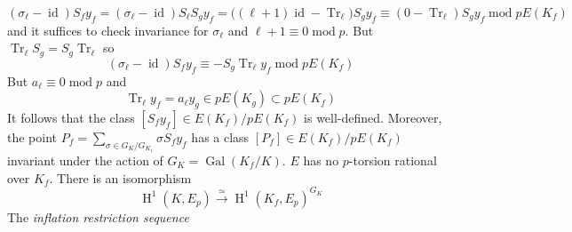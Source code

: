 \documentclass[paper=a4, fontsize=11pt]{scrartcl}
\DeclareMathOperator{\id}{\text{id}}
\DeclareMathOperator{\Gal}{\text{Gal}}
\DeclareMathOperator{\Tr}{\text{Tr}}
\DeclareMathOperator{\mmm}{\text{ mod }}
\DeclareMathOperator{\hoho}{\text{H}}
\numberwithin{equation}{section}
\numberwithin{figure}{section}
\numberwithin{table}{section}
\begin{document}
$$(\sigma_\ell-\id)S_fy_f=(\sigma_\ell-\id)S_\ell S_g y_f=\Big((\ell+1)\id-\Tr_\ell\Big)S_g y_f\equiv (0 - \Tr_\ell)S_gy_f\mmm pE(K_f)$$
and it suffices to check invariance for $\sigma_\ell$ and $\ell+1\equiv 0\mmm p $. But $\Tr_\ell S_g=S_g\Tr_\ell$ so
$$(\sigma_\ell-\id)S_fy_f\equiv - S_g\Tr_\ell y_f\mmm pE(K_f)$$
But $a_\ell\equiv 0 \mmm p$ and
$$\Tr_\ell y_f=a_\ell y_g\in pE(K_g)\subset pE(K_f)$$ 
It follows that the class $[S_f y_f]\in E(K_f)/pE(K_f)$ is well-defined. Moreover, the point $P_f=\sum_{\sigma\in G_K/G_{K_1}}\sigma S_f y_f$ has a class $[P_f]\in E(K_f)/pE(K_f)$ invariant under the action of $G_K=\Gal(K_f/K)$.
$E$ has no $p$-torsion rational over $K_f$. %
There is an isomorphism 
$$\hoho^1(K,E_p)\stackrel{\simeq}{\rightarrow}\hoho^1(K_f,E_p)^{G_K}$$ %
The \textit{inflation restriction sequence}
\end{document}
